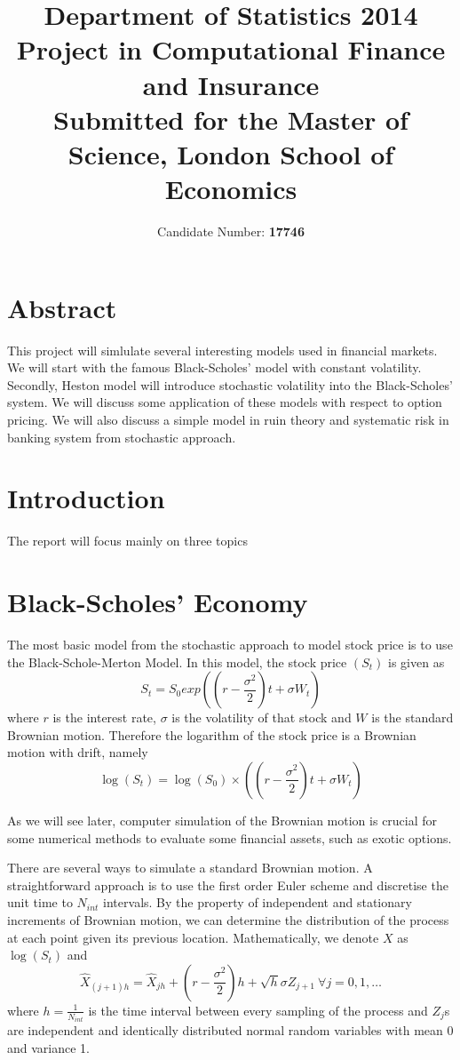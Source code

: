 \documentclass[a4paper, 11pt]{article}
\begin{document}
\title{Department of Statistics 2014\\ {\bf Project in Computational Finance and Insurance}\\ {\small Submitted for the Master of Science, London School of Economics} }
\author{Candidate Number: \bf 17746}
\maketitle
\vfill
\section*{Abstract}
This project will simlulate several interesting models used in financial markets. We will start with the famous Black-Scholes' model with constant volatility. Secondly, Heston model will introduce stochastic volatility into the Black-Scholes' system. We will discuss some application of these models with respect to option pricing.
We will also discuss a simple model in ruin theory and systematic risk in banking system from stochastic approach.

\newpage

\section{Introduction}
The report will focus mainly on three topics 

\section{Black-Scholes' Economy}
The most basic model from the stochastic approach to model stock price is to use the Black-Schole-Merton Model. In this model, the stock price $(S_t)$ is given as
$$S_t = S_0 exp\left( (r - \frac{\sigma^2}{2} )t + \sigma W_t \right)$$
where $r$ is the interest rate, $\sigma$ is the volatility of that stock and $W$ is the standard Brownian motion. Therefore the logarithm of the stock price is a Brownian motion with drift, namely 
$$\log(S_t) = \log(S_0) \times ((r - \frac{\sigma^2}{2} )t + \sigma W_t )$$

As we will see later, computer simulation of the Brownian motion is crucial for some numerical methods to evaluate some financial assets, such as exotic options. 

There are several ways to simulate a standard Brownian motion. A straightforward approach is to use the first order Euler scheme and discretise the unit time to $N_{int}$ intervals. By the property of independent and stationary increments of Brownian motion, we can determine the distribution of the process at each point given its previous location. Mathematically, we denote $X$ as $\log(S_t)$ and
$$ \hat{X}_{(j+1)h} = \hat{X}_{jh} +( r-\frac{\sigma^2}{2})h +\sqrt{h} \sigma Z_{j+1}\  \forall j = 0, 1, \dots $$
where $h = \frac{1}{N_{int}}$ is the time interval between every sampling of the process and $Z_j$s are independent and identically distributed normal random variables with mean 0 and variance 1.
\end{document}
